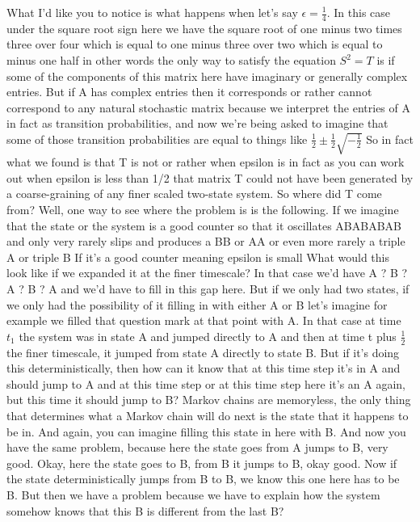 \documentclass[]{article}
\begin{document}
What I'd like you to notice is what
happens when let's say $\epsilon=\frac{1}{4}$.
In this case under the square root sign here
we have the square root of one minus two
times three over four which is equal to
one minus three over two which is
equal to minus one half
in other words the only way to satisfy
the equation $S^2=T$
is if some of the components of this matrix here
have imaginary or generally complex entries.
But if A has complex entries then it
corresponds or rather cannot correspond to any
natural stochastic matrix because we
interpret the entries of A
in fact as transition probabilities, and now we're
being asked to imagine
that some of those transition probabilities are equal to things
like $\frac{1}{2} \pm \frac{1}{2} \sqrt{-\frac{1}{2}}$
So in fact what we found is that T is not
or rather when epsilon is in fact as you can work out
when epsilon is less than 1/2
that matrix T could not have been generated by a
coarse-graining of any finer scaled two-state system.
So where did T come from?
Well, one way to see where the problem is is the following.
If we imagine that the state or the system
is a good counter
so that it oscillates ABABABAB
and only very rarely slips and produces a BB
or AA or even more rarely a
triple A or triple B
If it's a good counter meaning epsilon is small
What would this look like if we expanded it
at the finer timescale?
In that case we'd have A ? B ? A ? B ? A
and we'd have to fill in this gap here.
But if we only had two states,
if we only had the possibility of it filling in
with either A or B
let's imagine for example
we filled that question mark at that point with A.
In that case at time $t_1$
the system was in state A
and jumped directly to A
and then at time t plus $\frac{1}{2}$
the finer timescale, it jumped from state A
directly to state B.
But if it's doing this deterministically,
then how can it know that at this time step
it's in A and should jump to A
and at this time step or at this time step here
it's an A again,
but this time it should jump to B?
Markov chains are memoryless, the only thing that
determines what a Markov chain will do next
is the state that it happens to be in.
And again, you can imagine filling this state in here with B.
And now you have the same problem,
because here the state goes from A
jumps to B, very good.
Okay, here the state goes to B,
from B it jumps to B, okay good.
Now if the state deterministically jumps from B to B,
we know this one here has to be B.
But then we have a problem because we have to explain
how the system somehow knows that
this B is different from the last B?
\end{document}
